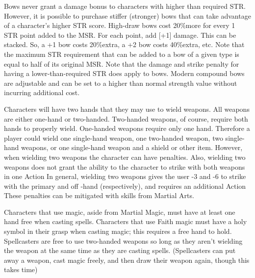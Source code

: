 \documentclass[twoside]{book}
\begin{document}
  
  

  

  
    {  
    Bows never grant a damage bonus to characters with higher than required STR. However, it is possible to purchase stiffer (stronger) bows that can take advantage of a character's higher STR score. High-draw bows cost 20\%more for every 1 STR point added to the MSR. For each point, add [+1] damage. This can be stacked. So, a +1 bow costs 20\%extra, a +2 bow costs 40\%extra, etc. Note that the maximum STR requirement that can be added to a bow of a given type is equal to half of its original MSR. Note that the damage and strike penalty for having a lower-than-required STR does apply to bows. Modern compound bows are adjustable and can be set to a higher than normal strength value without incurring additional cost.
    }
  
    {  
    Characters will have two hands that they may use to wield weapons. All weapons are either one-hand or two-handed. Two-handed weapons, of course, require both hands to properly wield. One-handed weapons require only one hand. Therefore a player could wield one single-hand weapon, one two-handed weapon, two single-hand weapons, or one single-hand weapon and a shield or other item. However, when wielding two weapons the character can have penalties. Also, wielding two weapons does not grant the ability to the character to strike with both weapons in one Action In general, wielding two weapons gives the user -3 and -6 to strike with the primary and off -hand (respectively), and requires an additional Action These penalties can be mitigated with skills from Martial Arts.
    }
  
    {  
    Characters that use magic, aside from Martial Magic, must have at least one hand free when casting spells. Characters that use Faith magic must have a holy symbol in their grasp when casting magic; this requires a free hand to hold. Spellcasters are free to use two-handed weapons so long as they aren't wielding the weapon at the same time as they are casting spells. (Spellcasters can put away a weapon, cast magic freely, and then draw their weapon again, though this takes time)
    }
  
\end{document}
